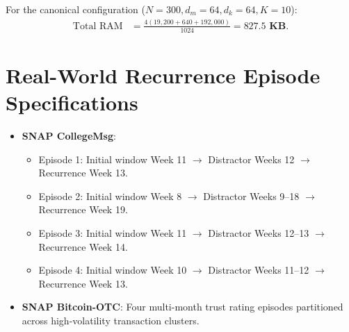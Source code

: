 For the canonical configuration ($N=300, d_m=64, d_k=64, K=10$):
\begin{align}
    \text{Total RAM} &= \frac{4 (19,200 + 640 + 192,000)}{1024} = \mathbf{827.5\text{ KB}}.
\end{align}

\section{Real-World Recurrence Episode Specifications}
\label{app:real_world}

\begin{itemize}
    \item \textbf{SNAP CollegeMsg}:
    \begin{itemize}
        \item Episode 1: Initial window Week 11 $\to$ Distractor Weeks 12 $\to$ Recurrence Week 13.
        \item Episode 2: Initial window Week 8 $\to$ Distractor Weeks 9--18 $\to$ Recurrence Week 19.
        \item Episode 3: Initial window Week 11 $\to$ Distractor Weeks 12--13 $\to$ Recurrence Week 14.
        \item Episode 4: Initial window Week 10 $\to$ Distractor Weeks 11--12 $\to$ Recurrence Week 13.
    \end{itemize}
    \item \textbf{SNAP Bitcoin-OTC}:
    Four multi-month trust rating episodes partitioned across high-volatility transaction clusters.
\end{itemize}
